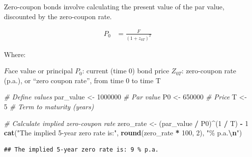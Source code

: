 \documentclass[
]{book}
\newenvironment{Shaded}{\begin{snugshade}}{\end{snugshade}}
\newcommand{\CommentTok}[1]{\textcolor[rgb]{0.56,0.35,0.01}{\textit{#1}}}
\newcommand{\DecValTok}[1]{\textcolor[rgb]{0.00,0.00,0.81}{#1}}
\newcommand{\FunctionTok}[1]{\textcolor[rgb]{0.13,0.29,0.53}{\textbf{#1}}}
\newcommand{\NormalTok}[1]{#1}
\newcommand{\OtherTok}[1]{\textcolor[rgb]{0.56,0.35,0.01}{#1}}
\newcommand{\SpecialCharTok}[1]{\textcolor[rgb]{0.81,0.36,0.00}{\textbf{#1}}}
\newcommand{\StringTok}[1]{\textcolor[rgb]{0.31,0.60,0.02}{#1}}
\begin{document}
Zero-coupon bonds involve calculating the present value of the par
value, discounted by the zero-coupon rate.

\[
\begin{align}
P_0 &= \frac{F}{(1 + z_{0T})^T}
\end{align}
\]

Where:

\(F\)ace value or principal \(P_0\): current (time 0) bond price
\(Z_{0T}\): zero-coupon rate (p.a.), or ``zero coupon rate'', from time
0 to time T

\begin{Shaded}
\begin{Highlighting}[]
\CommentTok{\# Define values}
\NormalTok{par\_value }\OtherTok{\textless{}{-}} \DecValTok{1000000}  \CommentTok{\# Par value}
\NormalTok{P0 }\OtherTok{\textless{}{-}} \DecValTok{650000}          \CommentTok{\# Price}
\NormalTok{T }\OtherTok{\textless{}{-}} \DecValTok{5}                \CommentTok{\# Term to maturity (years)}

\CommentTok{\# Calculate implied zero{-}coupon rate}
\NormalTok{zero\_rate }\OtherTok{\textless{}{-}}\NormalTok{ (par\_value }\SpecialCharTok{/}\NormalTok{ P0)}\SpecialCharTok{\^{}}\NormalTok{(}\DecValTok{1} \SpecialCharTok{/}\NormalTok{ T) }\SpecialCharTok{{-}} \DecValTok{1}
\FunctionTok{cat}\NormalTok{(}\StringTok{"The implied 5{-}year zero rate is:"}\NormalTok{, }\FunctionTok{round}\NormalTok{(zero\_rate }\SpecialCharTok{*} \DecValTok{100}\NormalTok{, }\DecValTok{2}\NormalTok{), }\StringTok{"\% p.a.}\SpecialCharTok{\textbackslash{}n}\StringTok{"}\NormalTok{)}
\end{Highlighting}
\end{Shaded}

\begin{verbatim}
## The implied 5-year zero rate is: 9 % p.a.
\end{verbatim}
\end{document}
